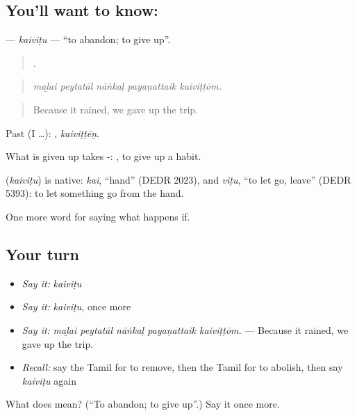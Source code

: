 \subsection*{You'll want to know: }
\textbf{} — \emph{kaiviṭu} — \textquotedblleft{}to abandon; to give up\textquotedblright{}.

\begin{quote}
    .
\end{quote}

\begin{quote}
\emph{maḻai peytatāl nāṅkaḷ payaṇattaik kaiviṭṭōm.}
\end{quote}

\begin{quote}
Because it rained, we gave up the trip.
\end{quote}

Past (I …): , \emph{kaiviṭṭēṉ}.

What is given up takes -:  , to give up a habit.

\begin{cousinweb}
\textbf{} (\emph{kaiviṭu}) is native: \emph{kai}, \textquotedblleft{}hand\textquotedblright{} (DEDR 2023), and \emph{viṭu}, \textquotedblleft{}to let go, leave\textquotedblright{} (DEDR 5393): to let something go from the hand.
\end{cousinweb}

\begin{grammarlens}[title={What you've built}]
One more word for saying what happens if.
\end{grammarlens}

\subsection*{Your turn}
\begin{itemize}
\raggedright
  \item \emph{Say it:} \emph{kaiviṭu}
  \item \emph{Say it:} \emph{kaiviṭu}, once more
  \item \emph{Say it:} \emph{maḻai peytatāl nāṅkaḷ payaṇattaik kaiviṭṭōm.} — Because it rained, we gave up the trip.
  \item \emph{Recall:} say the Tamil for to remove, then the Tamil for to abolish, then say \emph{kaiviṭu} again
\end{itemize}

\begin{tcolorbox}[breakable,colback=teal!4,colframe=teal!35!black,title={Before you move on}]
What does  mean? (\textquotedblleft{}To abandon; to give up\textquotedblright{}.) Say it once more.
\end{tcolorbox}
